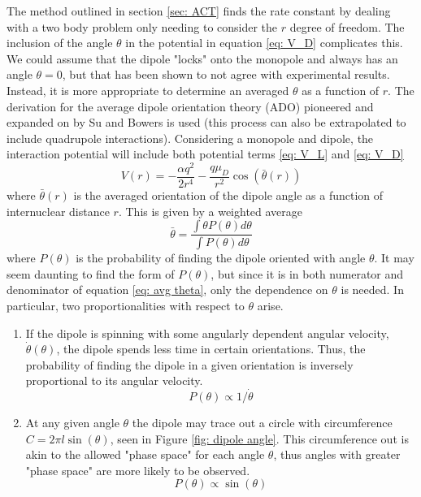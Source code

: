 The method outlined in section \ref{sec: ACT} finds the rate constant by dealing with a two body problem only needing to consider the $r$ degree of freedom. The inclusion of the angle $\theta$ in the potential in equation \ref{eq: V_D} complicates this. We could assume that the dipole "locks" onto the monopole and always has an angle $\theta=0$, but that has been shown to not agree with experimental results.\cite{Su1973a} Instead, it is more appropriate to determine an averaged $\theta$ as a function of $r$. The derivation for the average dipole orientation theory (ADO) pioneered and expanded on by Su and Bowers is used (this process can also be extrapolated to include quadrupole interactions\cite{Su1975}).\cite{Su1973, Su1973a} Considering a monopole and dipole, the interaction potential will include both potential terms \ref{eq: V_L} and \ref{eq: V_D}
\begin{equation}
    V(r) = -\frac{\alpha q^2}{2r^4} - \frac{q\mu_D}{r^2} \cos\left(\bar{\theta}(r)\right)
    \label{eq: V_L+V_D}
\end{equation}
where $\bar{\theta}(r)$ is the averaged orientation of the dipole angle as a function of internuclear distance $r$. This is given by a weighted average
\begin{equation}
	\bar{\theta} = \dfrac{\int \theta P(\theta) d\theta}{\int P(\theta) d\theta} \label{eq: avg theta}
\end{equation}
where $P(\theta)$ is the probability of finding the dipole oriented with angle $\theta$. It may seem daunting to find the form of $P(\theta)$, but since it is in both numerator and denominator of equation \ref{eq: avg theta}, only the dependence on $\theta$ is needed. In particular, two proportionalities with respect to $\theta$ arise.
\begin{enumerate}
	\item If the dipole is spinning with some angularly dependent angular velocity, $\dot{\theta}(\theta)$, the dipole spends less time in certain orientations. Thus, the probability of finding the dipole in a given orientation is inversely proportional to its angular velocity.
	\begin{equation}
		P(\theta) \propto 1/\dot{\theta} \label{eq: prop case 1}
	\end{equation}
	\item At any given angle $\theta$ the dipole may trace out a circle with circumference $C = 2\pi l \sin(\theta)$, seen in Figure \ref{fig: dipole angle}. This circumference out is akin to the allowed "phase space" for each angle $\theta$, thus angles with greater "phase space" are more likely to be observed.
	\begin{equation}
		P(\theta) \propto \sin(\theta) \label{eq: prop case 2}
	\end{equation}
\end{enumerate}

